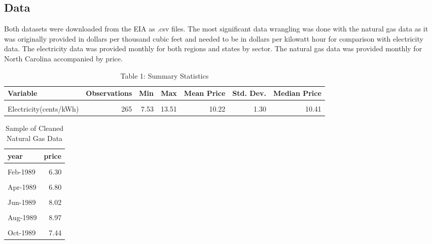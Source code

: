 \documentclass[
]{article}
\begin{document}
\hypertarget{data}{%
\subsection{Data}\label{data}}

Both datasets were downloaded from the EIA as .csv files. The most
significant data wrangling was done with the natural gas data as it was
originally provided in dollars per thousand cubic feet and needed to be
in dollars per kilowatt hour for comparison with electricity data. The
electricity data was provided monthly for both regions and states by
sector. The natural gas data was provided monthly for North Carolina
accompanied by price.

\begin{table}[H]

\caption{\label{tab:unnamed-chunk-1}Table 1: Summary Statistics}
\centering
\begin{tabular}[t]{l|r|r|r|r|r|r}
\hline
Variable & Observations & Min & Max & Mean Price & Std. Dev. & Median Price\\
\hline
\cellcolor{gray!6}{Natural Gas (\$/Mcf)} & \cellcolor{gray!6}{410} & \cellcolor{gray!6}{5.54} & \cellcolor{gray!6}{30.43} & \cellcolor{gray!6}{13.78} & \cellcolor{gray!6}{5.64} & \cellcolor{gray!6}{12.54}\\
\hline
Electricity(cents/kWh) & 265 & 7.53 & 13.51 & 10.22 & 1.30 & 10.41\\
\hline
\end{tabular}
\end{table}

\begin{table}[H]

\caption{\label{tab:unnamed-chunk-2}Sample of Cleaned Natural Gas Data}
\centering
\begin{tabular}[t]{l|r}
\hline
year & price\\
\hline
\cellcolor{gray!6}{Jan-1989} & \cellcolor{gray!6}{6.17}\\
\hline
Feb-1989 & 6.30\\
\hline
\cellcolor{gray!6}{Mar-1989} & \cellcolor{gray!6}{6.29}\\
\hline
Apr-1989 & 6.80\\
\hline
\cellcolor{gray!6}{May-1989} & \cellcolor{gray!6}{6.99}\\
\hline
Jun-1989 & 8.02\\
\hline
\cellcolor{gray!6}{Jul-1989} & \cellcolor{gray!6}{8.71}\\
\hline
Aug-1989 & 8.97\\
\hline
\cellcolor{gray!6}{Sep-1989} & \cellcolor{gray!6}{8.68}\\
\hline
Oct-1989 & 7.44\\
\hline
\end{tabular}
\end{table}
\end{document}
